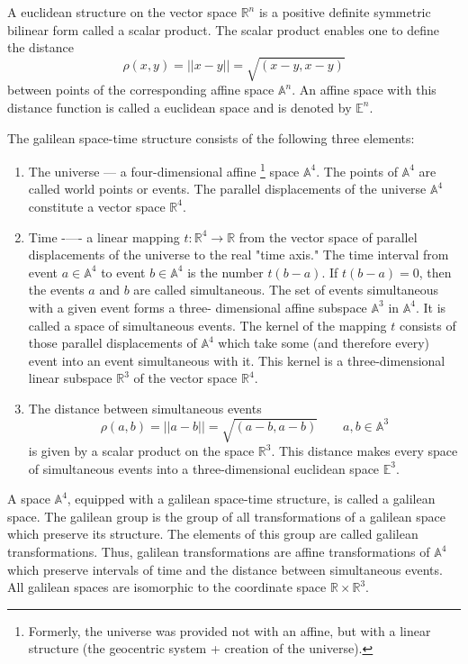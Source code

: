 \documentclass[11pt]{book}
\begin{document}
A euclidean structure on the vector space $\mathbb{R}^n$ is a positive definite symmetric
bilinear form called a scalar product. The scalar product enables one to
define the distance
\[ \rho(x,y)=||x-y||=\sqrt{(x - y,x- y)} \]
between points of the corresponding affine space $\mathbb{A}^n$. An affine space with this
distance function is called a euclidean space and is denoted by $\mathbb{E}^n$.

The galilean space-time structure consists of the following three elements:
\begin{enumerate}
    \item The universe --- a four-dimensional affine \footnote{Formerly, the universe was provided not with an affine, but with a linear structure (the geocentric system + creation of the universe).} space $\mathbb{A}^4$. 
        The points of $\mathbb{A}^4$ are called world points or events. 
        The parallel displacements of the universe $\mathbb{A}^4$
        constitute a vector space $\mathbb{R}^4$.
    \item Time -—- a linear mapping $t: \mathbb{R}^4 \rightarrow \mathbb{R}$ 
        from the vector space of parallel displacements of the 
        universe to the real "time axis." 
        The time interval from event $a \in \mathbb{A}^4$ 
        to event $b \in \mathbb{A}^4$ is the number $t(b - a)$. 
        If $t(b - a) = 0$, then the events $a$ and $b$ are called simultaneous.
The set of events simultaneous with a given event forms a three-
dimensional affine subspace $\mathbb{A}^3$ in $\mathbb{A}^4$. 
        It is called a space of simultaneous events.
The kernel of the mapping $t$ consists of those parallel displacements of
 $\mathbb{A}^4$ which take some (and therefore every) event into an event simultaneous
with it. This kernel is a three-dimensional linear subspace $\mathbb{R}^3$ of the vector
space $\mathbb{R}^4$.
\item The distance between simultaneous events
    \[\rho(a, b) = ||a - b|| =\sqrt{(a - b,a - b)}\qquad a,b \in \mathbb{A}^3 \]
is given by a scalar product on the space $\mathbb{R}^3$. This distance makes every
space of simultaneous events into a three-dimensional euclidean space $\mathbb{E}^3$.
\end{enumerate}

A space $\mathbb{A}^4$, equipped with a galilean space-time structure, is called a
galilean space. The galilean group is the group of all transformations of a galilean space
which preserve its structure. The elements of this group are called galilean
transformations. Thus, galilean transformations are affine transformations
of $\mathbb{A}^4$ which preserve intervals of time and the distance between simultaneous
events. All galilean spaces are isomorphic to the coordinate space $\mathbb{R} \times \mathbb{R}^3$.
\end{document}

